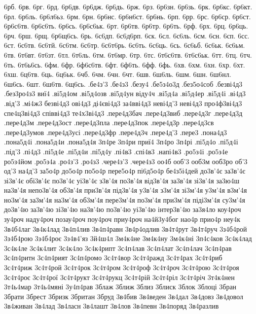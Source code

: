 {6рб. 6рв. 6рг. 6рд. 6р6дв. 6р6дж. 6р6дь. 6рж.
6рз. 6р6зн. 6р6зь. 6рк. 6р6кс. 6р6кт. 6рл. 6р6ль.
6р6л6ьз. 6рм. 6рн. 6р6нс. 6р6н6ст. 6р6нь. 6рп. 6рр.
6рс. 6р6ср. 6р6ст. 6р6с6тв. 6р6с6ть. 6р6сь. 6р6с6ьк. 6рт.
6р6тв. 6р6тр. 6р6ть. 6рф. 6рх. 6рц. 6р6ць. 6рч.
6рш. 6рщ. 6р6щ6сь. 6рь. 6с6дп. 6с6д6рп. 6ск. 6сл.
6с6ль. 6см. 6сн. 6сп. 6сс. 6ст. 6с6тв. 6с6тй.
6с6тм. 6с6тр. 6с6т6рь. 6с6ть. 6с6ць. 6сь. 6с6ьб. 6с6ьк.
6с6ьм. 6тв. 6т6вт. 6т6зт. 6тл. 6т6ль. 6тм. 6т6мр.
6тр. 6тс. 6т6с6тв. 6т6с6ьк. 6тт. 6тц. 6тч. 6ть.
6т6ь6сь. 6фм. 6фр. 6ф6с6тв. 6фт. 6ф6ть. 6фф. 6фь.
6хв. 6хм. 6хн. 6хр. 6хт. 6хш. 6ц6тв. 6ць.
6ц6ьк. 6чб. 6чм. 6чн. 6чт. 6шв. 6ш6ль. 6шм.
6шн. 6ш6нл. 6ш6сь. 6шт. 6ш6тв. 6щ6сь.
.бе4з'3
.бе4з3
.безу4
.бе5з4о3д
.без5о4соб
.безві4д3
.без3ро4з3
виї4
.ві5д4ом
.ві5д4озв
.ві5д4ун
віду4ч
.ві5д4а
.ві5д4ер
.ві5д4і
.ві4д3
.від'3
.мі4ж3
безві4д3
ові4д3
ді4єві4д3
за4вві4д3
неві4д'3
неві4д3
про4ф3ві4д3
спе4ц3ві4д3
співві4д3
те4х3ві4д3
.пере4д3бач
.пере4д3виб
.пере4д3г
.пере4д3д
.пере4д3м
.пере4д3ост
.пере4д3пла
.пере4д3пок
.пере4д3р
.пере4д3св
.пере4д3умов
.пере4д3усі
.пере4д3фр
.пере4д3ч
.пере4д'3
.пере3
.пона4д3
.пона5д4і
.пона5д4и
.пона5д4я
3п4ре
3п4ри
приї4
3п4ро
3п4рі
.пі5д4о
.пі5д4і
.під'3
.пі4д3
.пі5д4е
.пі5д4и
.пі5д4у
.пі4в3
.спі4в3
.напі4в3
.ро5з4і
.ро5з4е
ро5з4йом
.ро5з4а
.ро4з'3
.ро4з3
.чере4з'3
.чере4з3
оо4б
ооб'3
ооб3м
ооб3ро
об'3
од'3
на4д'3
за5о4р
до5о4р
по5о4р
пере5о4р
пі6д5о4р
бе4з5і4дей
до3в'4є
за3в'4є
зі3в'4є
обі3в'4є
по3в'4є
уі3в'4є
з3в'4я
по3в'4я
від3в'4я
за3в'4я
зі3в'4я
за3ю4ш
на3в'4я
непо3в'4я
об3в'4я
при3в'4я
під3в'4я
у3в'4я
з3м'4я
зі3м'4я
у3м'4я
в3м'4я
но3м'4я
за3м'4я
на3м'4я
об3м'4я
пере3м'4я
по3м'4я
при3м'4я
піді3м'4я
су3м'4я
до3в'4ю
за3в'4ю
зі3в'4ю
на3в'4ю
по3в'4ю
уі3в'4ю
інтер3в'4ю
за3я4ло
коу4роч
зу4роч
наду4роч
позау4роч
поу4роч
приу4роч
на4й3у4бог
нао4р
прио4р
неу4к
3в4б4лаг
3в4к4лад
3в4п4лив
3в4п4равн
3в4р4одлив
3в4т4рут
3в4т4руч
3з4б4рой
3з4б4рою
3з4б4роє
3з4в4'яз
3й4ш4л
3м4к4не
3м4к4ну
3м4к4ні
3п4с4ков
3с4к4лад
3с4к4ле
3с4к4лит
3с4к4ло
3с4к4рипт
3с4п4лав
3с4п4лат
3с4п4лач
3с4п4рав
3с4п4ритн
3с4п4рият
3с4п4ромо
3с4т4вор
3с4т4ражд
3с4т4рах
3с4т4риб
3с4т4риж
3с4т4рой
3с4т4рок
3с4т4ром
3с4т4роф
3с4т4роч
3с4т4рою
3с4т4роя
3с4т4роє
3с4т4рої
3с4т4рукт
3с4т4рукц
3с4т4рій
3с4т4ріл
3с4т4річ
3т4к4нен
3т4ь4мар
3т4ь4мяні
3у4п4рав
3блаж
3ближ
3близ
3блиск
3блок
3блоці
3бран
3брати
3брест
3бризк
3британ
3бруд
3в4бив
3в4веден
3в4дал
3в4довз
3в4довол
3в4живан
3в4лад
3в4ласн
3в4лашт
3в4лов
3в4певн
3в4поряд
3в4разлив
}
